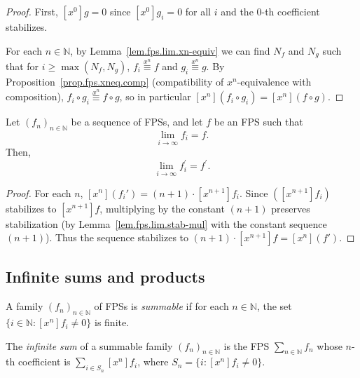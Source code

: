 \begin{proof}
\leanok
First, $[x^0]g = 0$ since $[x^0]g_i = 0$ for all $i$ and the $0$-th
coefficient stabilizes.

For each $n \in \mathbb{N}$, by Lemma~\ref{lem.fps.lim.xn-equiv} we can find
$N_f$ and $N_g$ such that for $i \geq \max(N_f, N_g)$, $f_i \overset{x^n}{\equiv} f$
and $g_i \overset{x^n}{\equiv} g$. By Proposition~\ref{prop.fps.xneq.comp}
(compatibility of $x^n$-equivalence with composition),
$f_i \circ g_i \overset{x^n}{\equiv} f \circ g$, so in particular
$[x^n](f_i \circ g_i) = [x^n](f \circ g)$.
\end{proof}

\begin{proposition}
\label{prop.fps.lim.deriv-lim}
\leantarget
\leanok
Let $\left(  f_{n}\right)  _{n\in\mathbb{N}}$ be
a sequence of FPSs, and let $f$ be an FPS such that%
\[
\lim\limits_{i\rightarrow\infty}f_{i}=f.
\]
Then,%
\[
\lim\limits_{i\rightarrow\infty}f_{i}^{\prime}=f^{\prime}.
\]
\end{proposition}

\begin{proof}
\leanok
For each $n$, $[x^n](f_i') = (n+1) \cdot [x^{n+1}]f_i$. Since $([x^{n+1}]f_i)$
stabilizes to $[x^{n+1}]f$, multiplying by the constant $(n+1)$ preserves
stabilization (by Lemma~\ref{lem.fps.lim.stab-mul} with the constant sequence
$(n+1)$). Thus the sequence stabilizes to $(n+1) \cdot [x^{n+1}]f = [x^n](f')$.
\end{proof}

\subsection{Infinite sums and products}

\begin{definition}
\label{def.fps.lim.isSummable}
\leanhelper
\leanok
A family $(f_n)_{n \in \mathbb{N}}$ of FPSs is \emph{summable} if for each
$n \in \mathbb{N}$, the set $\{i \in \mathbb{N} : [x^n] f_i \neq 0\}$ is finite.
\end{definition}

\begin{definition}
\label{def.fps.lim.tsum}
\leanhelper
\leanok
The \emph{infinite sum} of a summable family $(f_n)_{n \in \mathbb{N}}$ is the FPS
$\sum_{n \in \mathbb{N}} f_n$ whose $n$-th coefficient is
$\sum_{i \in S_n} [x^n] f_i$, where $S_n = \{i : [x^n] f_i \neq 0\}$.
\end{definition}

